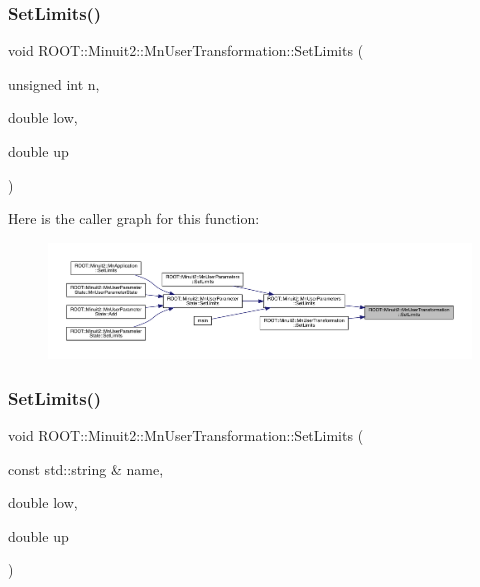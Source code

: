 \mbox{\label{classROOT_1_1Minuit2_1_1MnUserTransformation_ad45b1ae620fbf8ca9f77846b80cca808}} 
\subsubsection{\texorpdfstring{SetLimits()}{SetLimits()}\hspace{0.1cm}{\footnotesize\ttfamily [2/4]}}
{\footnotesize\ttfamily void R\+O\+O\+T\+::\+Minuit2\+::\+Mn\+User\+Transformation\+::\+Set\+Limits (\begin{DoxyParamCaption}\item[{unsigned int}]{n,  }\item[{double}]{low,  }\item[{double}]{up }\end{DoxyParamCaption})}

Here is the caller graph for this function\+:\nopagebreak
\begin{figure}[H]
\begin{center}
\leavevmode
\includegraphics[width=350pt]{d9/d98/classROOT_1_1Minuit2_1_1MnUserTransformation_ad45b1ae620fbf8ca9f77846b80cca808_icgraph}
\end{center}
\end{figure}
\mbox{\label{classROOT_1_1Minuit2_1_1MnUserTransformation_ae00c15c6e7def8b4c1c1c9d44b52e647}} 
\subsubsection{\texorpdfstring{SetLimits()}{SetLimits()}\hspace{0.1cm}{\footnotesize\ttfamily [3/4]}}
{\footnotesize\ttfamily void R\+O\+O\+T\+::\+Minuit2\+::\+Mn\+User\+Transformation\+::\+Set\+Limits (\begin{DoxyParamCaption}\item[{const std\+::string \&}]{name,  }\item[{double}]{low,  }\item[{double}]{up }\end{DoxyParamCaption})}

